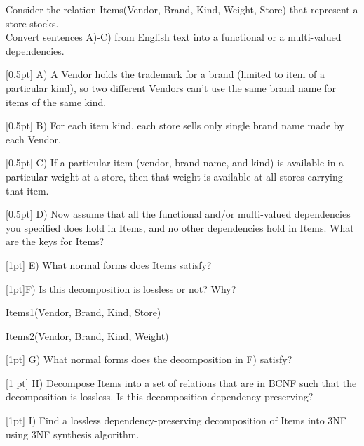 \begin{problem}
    Consider the relation Items(Vendor, Brand, Kind, Weight, Store) that represent a store stocks. \\
    Convert sentences A)-C) from English text into a functional or a multi-valued dependencies.

    [0.5pt] A) A Vendor holds the trademark for a brand (limited to item of a particular kind), so two different Vendors can't use the same brand name for items of the same kind.


    [0.5pt] B) For each item kind, each store sells only single brand name made by each Vendor.


    [0.5pt] C) If a particular item (vendor, brand name, and kind) is available in a particular weight at a store, then that weight is available at all stores carrying that item.


    [0.5pt] D) Now assume that all the functional and/or multi-valued dependencies you specified does hold in Items, and no other dependencies hold in Items. What are the keys for Items?


    [1pt] E) What normal forms does Items satisfy?


    [1pt]F) Is this decomposition is lossless or not? Why?


    Items1(Vendor, Brand, Kind, Store) 


    Items2(Vendor, Brand, Kind, Weight)


    [1pt] G) What normal forms does the decomposition in F) satisfy?


    [1 pt] H) Decompose Items into a set of relations that are in BCNF such that the decomposition is lossless. Is this decomposition dependency-preserving?


    [1pt] I) Find a lossless dependency-preserving decomposition of Items into 3NF using 3NF synthesis algorithm.
\end{problem}
